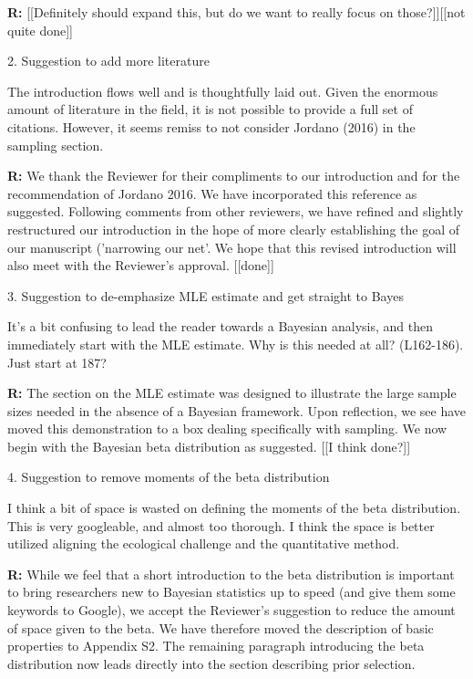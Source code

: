 \documentclass[12pt]{letter}
\newenvironment{refquote}{\bigskip \begin{it}}{\end{it}\smallskip}
\begin{document}
	\textbf{R:} [[Definitely should expand this, but do we want to really focus on those?]][[not quite done]]


	2. Suggestion to add more literature

	\begin{refquote}
	The introduction flows well and is thoughtfully laid out. Given the enormous amount of literature in the field, it is not possible to provide a full set of citations. However, it seems remiss to not consider Jordano (2016) in the sampling section.
	\end{refquote}

	\textbf{R:} We thank the Reviewer for their compliments to our introduction and for the recommendation of Jordano 2016. We have incorporated this reference as suggested. Following comments from other reviewers, we have refined and slightly restructured our introduction in the hope of more clearly establishing the goal of our manuscript ('narrowing our net'. We hope that this revised introduction will also meet with the Reviewer's approval. [[done]]


	3. Suggestion to de-emphasize MLE estimate and get straight to Bayes

	\begin{refquote}
	It’s a bit confusing to lead the reader towards a Bayesian analysis, and then immediately start with the MLE estimate. Why is this needed at all? (L162-186). Just start at 187?
	\end{refquote}

	\textbf{R:} The section on the MLE estimate was designed to illustrate the large sample sizes needed in the absence of a Bayesian framework. Upon reflection, we see have moved this demonstration to a box dealing specifically with sampling. We now begin with the Bayesian beta distribution as suggested. [[I think done?]]


	4. Suggestion to remove moments of the beta distribution

	\begin{refquote}
	I think a bit of space is wasted on defining the moments of the beta distribution. This is very googleable, and almost too thorough. I think the space is better utilized aligning the ecological challenge and the quantitative method.
	\end{refquote}

	\textbf{R:} While we feel that a short introduction to the beta distribution is important to bring researchers new to Bayesian statistics up to speed (and give them some keywords to Google), we accept the Reviewer's suggestion to reduce the amount of space given to the beta. We have therefore moved the description of basic properties to Appendix S2. The remaining paragraph introducing the beta distribution now leads directly into the section describing prior selection.
\end{document}
